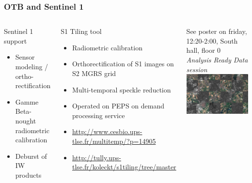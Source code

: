 \documentclass[8pt,aspectratio=169]{beamer}
\begin{document}
\begin{frame}
  \frametitle{OTB and Sentinel 1}
  \begin{columns}
    \begin{block}{Sentinel 1 support}
      \begin{itemize}
      \item Sensor modeling / ortho-rectification
      \item Gamme Beta-nought radiometric calibration
      \item Deburst of IW products
      \end{itemize}
    \end{block}

    \begin{block}{S1 Tiling tool}
      \begin{itemize}
      \item Radiometric calibration
      \item Orthorectification of S1 images on S2 MGRS grid
      \item Multi-temporal speckle reduction
      \item Operated on PEPS on demand processing service
      \item \small{\url{http://www.cesbio.ups-tlse.fr/multitemp/?p=14905}}
      \item \small{\url{http://tully.ups-tlse.fr/koleckt/s1tiling/tree/master}}
      \end{itemize}
      \end{block}

    \begin{center}

      \small{See poster on friday, 12:20-2:00, South hall, floor 0\\ \emph{Analysis Ready Data session}}\\
      \vspace{0.5cm}
      \includegraphics[width=\textwidth]{s1_s2.png}
    \end{center}
  \end{columns}
    
    
    \end{frame}
\end{document}
